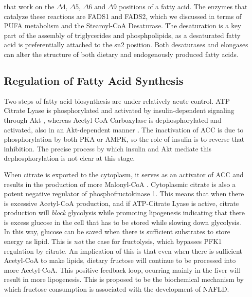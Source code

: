\documentclass{tufte-handout}
\begin{document}
 that work on the $\Delta$4, $\Delta$5, $\Delta$6 and $\Delta$9 positions of a fatty acid.  The enzymes that catalyze these reactions are FADS1 and FADS2, which we discussed in terms of PUFA metabolism and the Stearoyl-CoA Desaturase.  The desaturation is a key part of the assembly of triglycerides and phosphpolipids, as a desaturated fatty acid is preferentially attached to the sn2 position.  Both desaturases and elongases can alter the structure of both dietary and endogenously produced fatty acids.

\subsection{Regulation of Fatty Acid Synthesis}

Two steps of fatty acid biosynthesis are under relatively acute control.  ATP-Citrate Lyase is phosphorylated and activated by insulin-dependent signaling through Akt \citep{Berwick2002}, whereas Acetyl-CoA Carboxylase is dephosphorylated and activated, also in an Akt-dependent manner \citep{Witters1992}.  The inactivation of ACC is due to phosphorylation by both PKA or AMPK, so the role of insulin is to reverse that inhibition.  The precise process by which insulin and Akt mediate this dephosphorylation is not clear at this stage.  

  When citrate is exported to the cytoplasm, it serves as an activator of ACC and results in the production of more Malonyl-CoA \citep{VAGELOS1963}.  Cytoplasmic citrate is also a potent negative regulator of phosphofructokinase 1.  This means that when there is excessive Acetyl-CoA production, and if ATP-Citrate Lyase is active, citrate production will \emph{block} glycolysis while promoting lipogenesis indicating that there is excess glucose in the cell that has to be stored while slowing down glycolysis. In this way, glucose can be saved when there is sufficient substrates to store energy as lipid.  This is \emph{not} the case for fructolysis, which bypasses PFK1 regulation by citrate.  An implication of this is that even when there is sufficient Acetyl-CoA to make lipids, dietary fructose will continue to be processed into more Acetyl-CoA.  This positive feedback loop, ocurring mainly in the liver will result in more lipogenesis.  This is proposed to be the biochemical mechanism by which fructose consumption is associated with the development of NAFLD\citep{Lim2010}.
\end{document}
